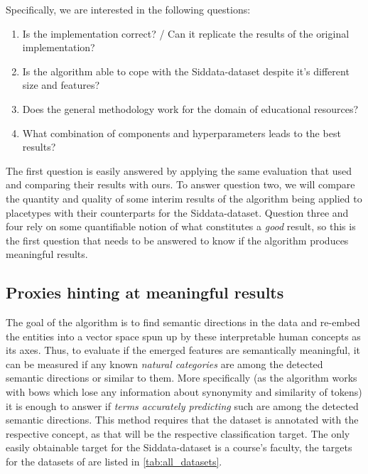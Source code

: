 Specifically, we are interested in the following questions:

\begin{enumerate}
	\item[\saveref{sec:results_placetypes}{1.}] Is the implementation correct? / Can it replicate the results of the original implementation?
	\item[\saveref{sec:results_datasetdiffs}{2.}] Is the algorithm able to cope with the Siddata-dataset despite it's different size and features?
	\item[\saveref{sec:results_siddata}{3.}] Does the general methodology work for the domain of educational resources?
	\item[\saveref{sec:results_params}{4.}] What combination of components and hyperparameters leads to the best results?
\end{enumerate}

The first question is easily answered by applying the same evaluation that \mainalgos used and comparing their results with ours. To answer question two, we will compare the quantity and quality of some interim results of the algorithm being applied to placetypes with their counterparts for the Siddata-dataset. Question three and four rely on some quantifiable notion of what constitutes a \emph{good} result, so this is the first question that needs to be answered to know if the algorithm produces meaningful results.

\subsection{Proxies hinting at meaningful results}

The goal of the algorithm is to find semantic directions in the data and re-embed the entities into a vector space spun up by these interpretable human concepts as its axes. Thus, to evaluate if the emerged features are semantically meaningful, it can be measured if any known \textit{natural categories} are among the detected semantic directions or similar to them. More specifically (as the algorithm works with \glspl{bow} which lose any information about synonymity and similarity of tokens) %
it is enough to answer if \emph{terms accurately predicting} such are among the detected semantic directions. This method requires that the dataset is annotated with the respective concept, as that will be the respective classification target. The only easily obtainable target for the Siddata-dataset is a course's faculty, the targets for the datasets of \mainalgos are listed in \autoref{tab:all_datasets}.

